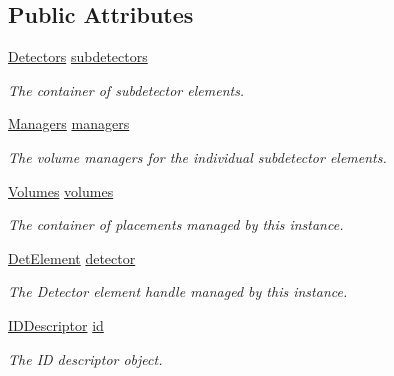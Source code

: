 \subsection*{Public Attributes}
\begin{DoxyCompactItemize}
\item 
\hyperlink{class_d_d4hep_1_1_geometry_1_1_volume_manager_object_a3148ed79d5f6e5175060519838dbad38}{Detectors} \hyperlink{class_d_d4hep_1_1_geometry_1_1_volume_manager_object_aaf80d4d14783bbcdc05eefe7d35519dc}{subdetectors}
\begin{DoxyCompactList}\small\item\em The container of subdetector elements. \end{DoxyCompactList}\item 
\hyperlink{class_d_d4hep_1_1_geometry_1_1_volume_manager_object_ad98004850761b06cd3a81c68cdcc0087}{Managers} \hyperlink{class_d_d4hep_1_1_geometry_1_1_volume_manager_object_aff0c698fcc27fa3778734a5c5bd6074f}{managers}
\begin{DoxyCompactList}\small\item\em The volume managers for the individual subdetector elements. \end{DoxyCompactList}\item 
\hyperlink{class_d_d4hep_1_1_geometry_1_1_volume_manager_object_a6bbeb958237bc33c7228abada088f6a1}{Volumes} \hyperlink{class_d_d4hep_1_1_geometry_1_1_volume_manager_object_a7ba195782a138b7e47a66389c5845ae6}{volumes}
\begin{DoxyCompactList}\small\item\em The container of placements managed by this instance. \end{DoxyCompactList}\item 
\hyperlink{class_d_d4hep_1_1_geometry_1_1_det_element}{Det\+Element} \hyperlink{class_d_d4hep_1_1_geometry_1_1_volume_manager_object_a998bff824dead1dfec1642f57eae9117}{detector}
\begin{DoxyCompactList}\small\item\em The Detector element handle managed by this instance. \end{DoxyCompactList}\item 
\hyperlink{class_d_d4hep_1_1_geometry_1_1_i_d_descriptor}{I\+D\+Descriptor} \hyperlink{class_d_d4hep_1_1_geometry_1_1_volume_manager_object_a34cf251ba79ecddf50f9fdaf50265968}{id}
\begin{DoxyCompactList}\small\item\em The ID descriptor object. \end{DoxyCompactList}\item 

\end{DoxyCompactItemize}
